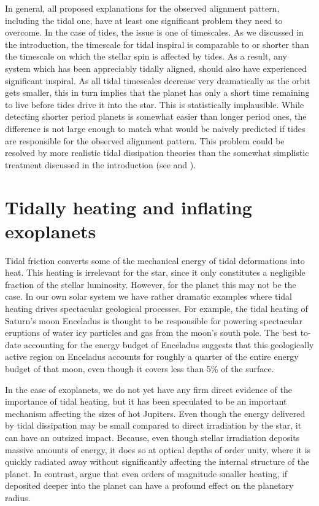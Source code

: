 In general, all proposed explanations for the observed alignment pattern,
including the tidal one, have at least one significant problem they need to
overcome. In the case of tides, the issue is one of timescales. As we discussed
in the introduction, the timescale for tidal inspiral is comparable to or
shorter than the timescale on which the stellar spin is affected by tides. As a
result, any system which has been appreciably tidally aligned, should also have
experienced significant inspiral. As all tidal timescales decrease very
dramatically as the orbit gets smaller, this in turn implies that the planet has
only a short time remaining to live before tides drive it into the star. This is
statistically implausible. While detecting shorter period planets is somewhat
easier than longer period ones, the difference is not large enough to match what
would be naively predicted if tides are responsible for the observed alignment
pattern. This problem could be resolved by more realistic tidal dissipation
theories than the somewhat simplistic treatment discussed in the introduction
(see \citep{Lai_12} and \citep{Anderson_et_al_21}).

\section{Tidally heating and inflating exoplanets}

Tidal friction converts some of the mechanical energy of tidal deformations into
heat. This heating is irrelevant for the star, since it only constitutes a
negligible fraction of the stellar luminosity. However, for the planet this may
not be the case. In our own solar system we have rather dramatic examples where
tidal heating drives spectacular geological processes. For example, the tidal
heating of Saturn's moon Enceladus is thought to be responsible for powering
spectacular eruptions of water icy particles and gas from the moon's south pole.
The best to-date accounting for the energy budget of Enceladus suggests that
this geologically active region on Enceladus accounts for roughly a quarter of
the entire energy budget of that moon, even though it covers less than 5\% of
the surface.

In the case of exoplanets, we do not yet have any firm direct evidence of the
importance of tidal heating, but it has been speculated to be an important
mechanism affecting the sizes of hot Jupiters. Even though the energy delivered
by tidal dissipation may be small compared to direct irradiation by the star, it
can have an outsized impact. Because, even though stellar irradiation deposits
massive amounts of energy, it does so at optical depths of order unity, where it
is quickly radiated away without significantly affecting the internal structure
of the planet. In contrast, \citet{Komacek_Youdin_17} argue that even orders of
magnitude smaller heating, if deposited deeper into the planet can have a
profound effect on the planetary radius.

